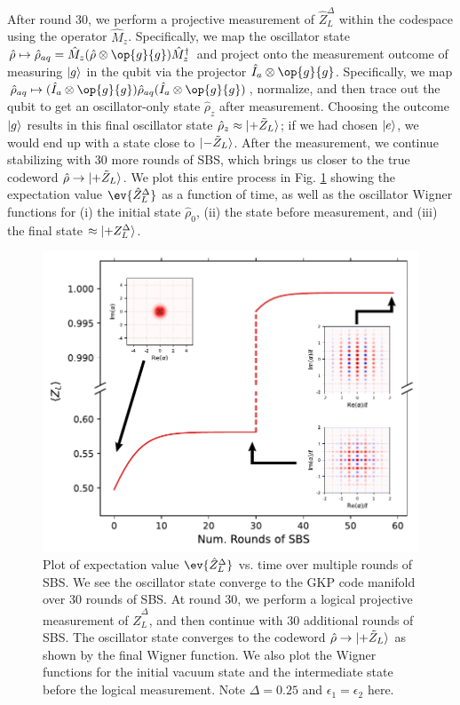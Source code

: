 After round 30, we perform a projective measurement of $\hat{Z}_L^\Delta$ within the codespace using the operator $\hat{M}_z$. Specifically, we map the oscillator state $\hat{\rho} \mapsto \hat{\rho}_{aq} = \hat{M}_z(\hat{\rho}\otimes \op{g}{g})\hat{M}_z^\dagger$ and project onto the measurement outcome of measuring $\lvert g\rangle$ in the qubit via the projector $\hat{I}_a \otimes \op{g}{g}$. Specifically, we map $\hat{\rho}_{aq} \mapsto (\hat{I}_a \otimes \op{g}{g}) \hat{\rho}_{aq}(\hat{I}_a \otimes \op{g}{g})$, normalize, and then trace out the qubit to get an oscillator-only state $\hat{\rho}_z$ after measurement. Choosing the outcome $\lvert g\rangle$ results in this final oscillator state $\hat{\rho}_z \approx \lvert+\tilde{Z}_L\rangle$; if we had chosen $\lvert e\rangle$, we would end up with a state close to $\lvert-\tilde{Z}_L\rangle$. After the measurement, we continue stabilizing with 30 more rounds of SBS, which brings us closer to the true codeword $\hat{\rho} \to \lvert+\tilde{Z}_L\rangle$. We plot this entire process in Fig. \ref{fig:2_SBS_NoLoss_QEC_Sim} showing the expectation value $\ev{\hat{Z}_L^\Delta}$ as a function of time, as well as the oscillator Wigner functions for (i) the initial state $\hat{\rho}_0$, (ii) the state before measurement, and (iii) the final state $\approx \lvert+Z_L^\Delta\rangle$. 

\begin{figure}[h]
    \centering
    \includegraphics[width=0.85\linewidth]{Figures/2/SBS_NoLoss_QEC_Sim.pdf}
    \caption{Plot of expectation value $\ev{\hat{Z}_L^\Delta}$ vs. time over multiple rounds of SBS. We see the oscillator state converge to the GKP code manifold over 30 rounds of SBS. At round 30, we perform a logical projective measurement of $\hat{Z}_L^\Delta$, and then continue with 30 additional rounds of SBS. The oscillator state converges to the codeword $\hat{\rho} \to \lvert+\tilde{Z}_L\rangle$ as shown by the final Wigner function. We also plot the Wigner functions for the initial vacuum state and the intermediate state before the logical measurement. Note $\Delta = 0.25$ and $\epsilon_1 = \epsilon_2$ here.}
    \label{fig:2_SBS_NoLoss_QEC_Sim}
\end{figure}




